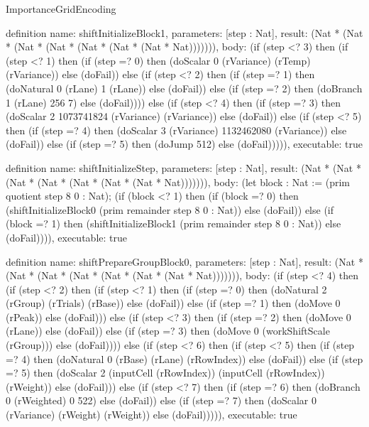 \begin{lexlean}{ImportanceGridEncoding}
\begin{semanticmodule}
definition{
  name: shiftInitializeBlock1,
  parameters: [step : Nat],
  result: (Nat * (Nat * (Nat * (Nat * (Nat * (Nat * (Nat * Nat))))))),
  body: (if (step <? 3) then
      (if (step <? 1) then
      (if (step =? 0) then (doScalar 0 (rVariance) (rTemp) (rVariance)) else (doFail)) else
      (if (step <? 2) then
      (if (step =? 1) then (doNatural 0 (rLane) 1 (rLane)) else (doFail)) else
      (if (step =? 2) then (doBranch 1 (rLane) 256 7) else (doFail)))) else
      (if (step <? 4) then
      (if (step =? 3) then (doScalar 2 1073741824 (rVariance) (rVariance)) else (doFail)) else
      (if (step <? 5) then
      (if (step =? 4) then (doScalar 3 (rVariance) 1132462080 (rVariance)) else (doFail)) else
      (if (step =? 5) then (doJump 512) else (doFail))))),
  executable: true
}

definition{
  name: shiftInitializeStep,
  parameters: [step : Nat],
  result: (Nat * (Nat * (Nat * (Nat * (Nat * (Nat * (Nat * Nat))))))),
  body: (let block : Nat := (prim quotient step 8 0 : Nat); (if (block <? 1) then
      (if (block =? 0) then (shiftInitializeBlock0 (prim remainder step 8 0 : Nat)) else (doFail)) else
      (if (block =? 1) then (shiftInitializeBlock1 (prim remainder step 8 0 : Nat)) else (doFail)))),
  executable: true
}

definition{
  name: shiftPrepareGroupBlock0,
  parameters: [step : Nat],
  result: (Nat * (Nat * (Nat * (Nat * (Nat * (Nat * (Nat * Nat))))))),
  body: (if (step <? 4) then
      (if (step <? 2) then
      (if (step <? 1) then
      (if (step =? 0) then (doNatural 2 (rGroup) (rTrials) (rBase)) else (doFail)) else
      (if (step =? 1) then (doMove 0 (rPeak)) else (doFail))) else
      (if (step <? 3) then
      (if (step =? 2) then (doMove 0 (rLane)) else (doFail)) else
      (if (step =? 3) then (doMove 0 (workShiftScale (rGroup))) else (doFail)))) else
      (if (step <? 6) then
      (if (step <? 5) then
      (if (step =? 4) then (doNatural 0 (rBase) (rLane) (rRowIndex)) else (doFail)) else
      (if (step =? 5) then (doScalar 2 (inputCell (rRowIndex)) (inputCell (rRowIndex)) (rWeight)) else (doFail))) else
      (if (step <? 7) then
      (if (step =? 6) then (doBranch 0 (rWeighted) 0 522) else (doFail)) else
      (if (step =? 7) then (doScalar 0 (rVariance) (rWeight) (rWeight)) else (doFail))))),
  executable: true
}


\end{semanticmodule}
\end{lexlean}
